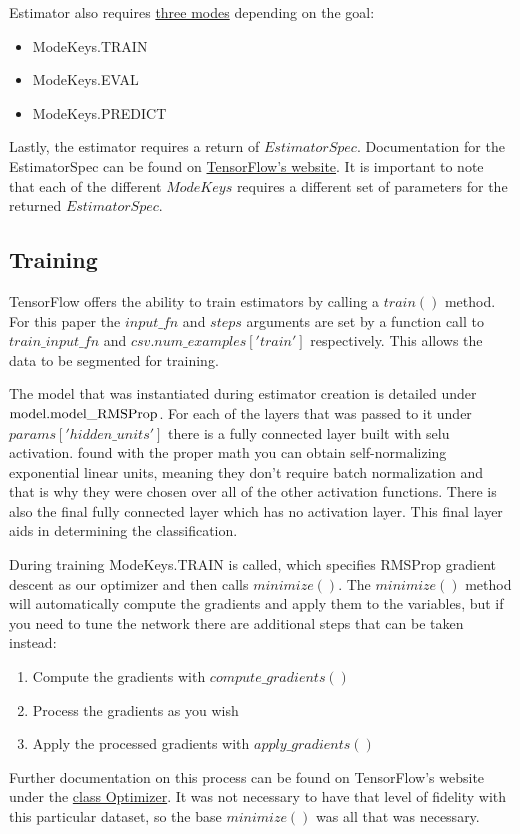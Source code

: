 \documentclass{article}
\begin{document}
  Estimator also requires \href{https://www.tensorflow.org/versions/r1.2/api_docs/python/tf/estimator/ModeKeys}{three modes} depending on the goal:
  \begin{itemize}
    \item ModeKeys.TRAIN
    \item ModeKeys.EVAL
    \item ModeKeys.PREDICT
  \end{itemize}
  Lastly, the estimator requires a return of $EstimatorSpec$. Documentation for 
  the EstimatorSpec can be found on \href{https://www.tensorflow.org/api_docs/python/tf/estimator/EstimatorSpec}{TensorFlow's website}. It is important to note that each of the different $ModeKeys$ requires a different set of parameters for the returned $EstimatorSpec$.

\subsection{Training}
  TensorFlow offers the ability to train estimators by calling a $train()$ 
  method. For this paper the $input\_fn$ and $steps$ arguments are set by a 
  function call to $train\_input\_fn$ and $csv.num\_examples['train']$ 
  respectively. This allows the data to be segmented for training.

  The model that was instantiated during estimator creation is detailed under
  $\textnormal{model.model\_RMSProp}$. For each of the layers that was passed 
  to it under $params['hidden\_units']$ there is a fully connected layer built 
  with selu activation. \citet{selu} found with the proper math you can obtain 
  self-normalizing exponential linear units, meaning they don't require batch 
  normalization and that is why they were chosen over all of the other 
  activation functions. There is also the final fully connected layer which has 
  no activation layer. This final layer aids in determining the classification.

  During training ModeKeys.TRAIN is called, which specifies RMSProp gradient 
  descent as our optimizer and then calls $minimize()$. The $minimize()$ method 
  will automatically compute the gradients and apply them to the variables, but 
  if you need to tune the network there are additional steps that can be taken 
  instead:
  \begin{enumerate}
    \item Compute the gradients with $compute\_gradients()$
    \item Process the gradients as you wish
    \item Apply the processed gradients with $apply\_gradients()$
  \end{enumerate}
  Further documentation on this process can be found on TensorFlow's website 
  under the \href{https://www.tensorflow.org/api_docs/python/tf/train/Optimizer}
  {class Optimizer}. It was not necessary to have that level of fidelity with 
  this particular dataset, so the base $minimize()$ was all that was necessary.
\end{document}
